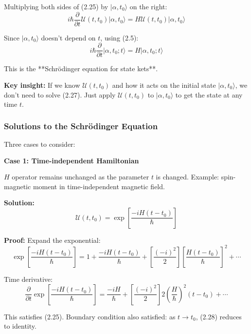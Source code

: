 \documentclass[11pt,a4paper]{article}
\begin{document}
Multiplying both sides of (2.25) by $|\alpha, t_0\rangle$ on the right:
\begin{equation}
i\hbar\frac{\partial}{\partial t}\mathscr{U}(t, t_0)|\alpha, t_0\rangle = H\mathscr{U}(t, t_0)|\alpha, t_0\rangle
\tag{2.26}
\end{equation}

Since $|\alpha, t_0\rangle$ doesn't depend on $t$, using (2.5):
\begin{equation}
\boxed{i\hbar\frac{\partial}{\partial t}|\alpha, t_0; t\rangle = H|\alpha, t_0; t\rangle}
\tag{2.27}
\end{equation}

This is the **Schrödinger equation for state kets**.

\textbf{Key insight:} If we know $\mathscr{U}(t, t_0)$ and how it acts on the initial state $|\alpha, t_0\rangle$, we don't need to solve (2.27). Just apply $\mathscr{U}(t, t_0)$ to $|\alpha, t_0\rangle$ to get the state at any time $t$.

\subsubsection{Solutions to the Schrödinger Equation}

Three cases to consider:

\textbf{Case 1: Time-independent Hamiltonian}

$H$ operator remains unchanged as the parameter $t$ is changed. Example: spin-magnetic moment in time-independent magnetic field.

\textbf{Solution:}
\begin{equation}
\boxed{\mathscr{U}(t, t_0) = \exp\left[\frac{-iH(t - t_0)}{\hbar}\right]}
\tag{2.28}
\end{equation}

\textbf{Proof:} Expand the exponential:
\begin{equation}
\exp\left[\frac{-iH(t - t_0)}{\hbar}\right] = 1 + \frac{-iH(t - t_0)}{\hbar} + \left[\frac{(-i)^2}{2}\right]\left[\frac{H(t - t_0)}{\hbar}\right]^2 + \cdots
\tag{2.29}
\end{equation}

Time derivative:
\begin{equation}
\frac{\partial}{\partial t}\exp\left[\frac{-iH(t - t_0)}{\hbar}\right] = \frac{-iH}{\hbar} + \left[\frac{(-i)^2}{2}\right]2\left(\frac{H}{\hbar}\right)^2(t - t_0) + \cdots
\tag{2.30}
\end{equation}

This satisfies (2.25). Boundary condition also satisfied: as $t \to t_0$, (2.28) reduces to identity.
\end{document}
